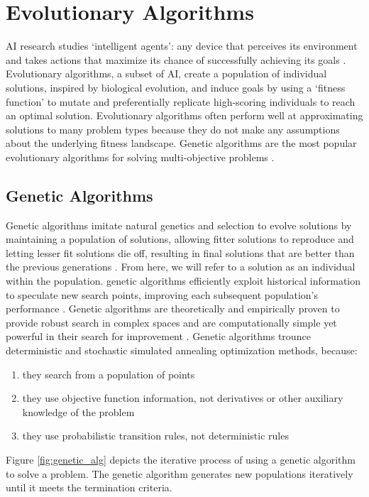 \section{Evolutionary Algorithms} 
\gls{AI} research studies `intelligent agents': any device that perceives 
its environment and takes actions that maximize its chance of successfully 
achieving its goals \cite{david_l_poole_computational_1998}.
Evolutionary algorithms, a subset of \gls{AI}, create a population of individual 
solutions, inspired by biological evolution, and induce goals by using a 
`fitness function' to mutate and preferentially replicate high-scoring 
individuals to reach an optimal solution.
Evolutionary algorithms often perform well at approximating solutions to many 
problem types because they do not make any assumptions about the 
underlying fitness landscape.
Genetic algorithms are the most popular evolutionary algorithms for solving 
multi-objective problems \cite{byrne_evolving_2014, krish_practical_2011}. 

\subsection{Genetic Algorithms}
\label{sec:genetic_alg}
Genetic algorithms imitate natural genetics and selection to evolve solutions 
by maintaining a population of solutions, allowing fitter solutions to reproduce
and letting lesser fit solutions die off, resulting in final solutions that are 
better than the previous generations \cite{renner_genetic_2003}. 
From here, we will refer to a solution as an individual within the population. 
genetic algorithms efficiently exploit historical information to speculate new search 
points, improving each subsequent population's performance 
\cite{goldberg_genetic_1989}. 
Genetic algorithms are theoretically and empirically proven to provide robust 
search in complex spaces and are computationally simple yet powerful 
in their search for improvement \cite{goldberg_genetic_1989}. 
Genetic algorithms trounce deterministic and stochastic simulated 
annealing optimization methods, because:
\begin{enumerate}
    \item they search from a population of points
    \item they use objective function information, not derivatives or other 
    auxiliary knowledge of the problem
    \item they use probabilistic transition rules, not deterministic rules
\end{enumerate}
Figure \ref{fig:genetic_alg} depicts the iterative process of using a genetic algorithm
to solve a problem. 
The genetic algorithm generates new populations iteratively until it meets the termination 
criteria. 

